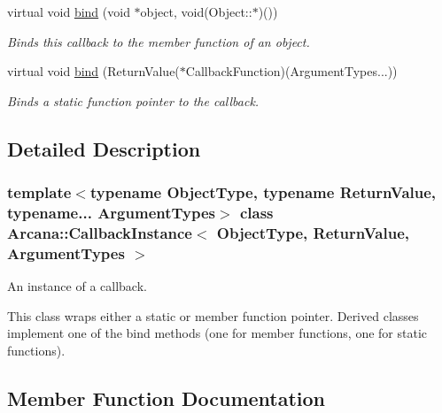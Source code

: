 \begin{DoxyCompactItemize}
virtual void \mbox{\hyperlink{class_arcana_1_1_callback_instance_a55e87e320e0133a4274c60e87a391a7e}{bind}} (void $\ast$object, void(Object\+::$\ast$)())
\begin{DoxyCompactList}\small\item\em Binds this callback to the member function of an object. \end{DoxyCompactList}\item 
virtual void \mbox{\hyperlink{class_arcana_1_1_callback_instance_a6d9b12af5b8a98b782257a7b10eaa7e9}{bind}} (Return\+Value($\ast$Callback\+Function)(Argument\+Types...))
\begin{DoxyCompactList}\small\item\em Binds a static function pointer to the callback. \end{DoxyCompactList}\end{DoxyCompactItemize}


\subsection{Detailed Description}
\subsubsection*{template$<$typename Object\+Type, typename Return\+Value, typename... Argument\+Types$>$\newline
class Arcana\+::\+Callback\+Instance$<$ Object\+Type, Return\+Value, Argument\+Types $>$}

An instance of a callback. 

This class wraps either a static or member function pointer. Derived classes implement one of the bind methods (one for member functions, one for static functions). 

\subsection{Member Function Documentation}
\mbox{\label{class_arcana_1_1_callback_instance_a55e87e320e0133a4274c60e87a391a7e}} 
